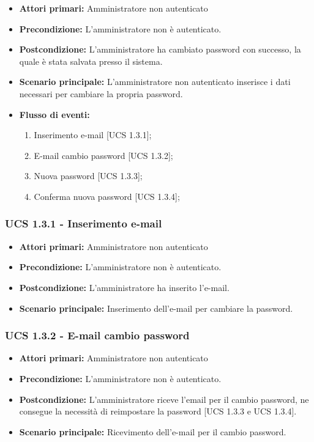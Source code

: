\begin{itemize}
\item \textbf{Attori primari:} Amministratore non autenticato
\item \textbf{Precondizione:}  L'amministratore non è autenticato.
\item \textbf{Postcondizione:} L'amministratore ha cambiato password con successo, la quale è stata salvata presso il sistema.
\item \textbf{Scenario principale:} L'amministratore non autenticato inserisce i dati necessari per cambiare la propria password.
\item \textbf{Flusso di eventi:}
    \begin{enumerate}
        \item Inserimento e-mail [UCS 1.3.1];
        \item E-mail cambio password [UCS 1.3.2];
        \item Nuova password [UCS 1.3.3];
        \item Conferma nuova password [UCS 1.3.4];
    \end{enumerate}
\end{itemize}

\subsubsection{UCS 1.3.1 - Inserimento e-mail}
\begin{itemize}
\item \textbf{Attori primari:} Amministratore non autenticato
\item \textbf{Precondizione:} L'amministratore non è autenticato. %
\item \textbf{Postcondizione:} L'amministratore ha inserito l'e-mail.
\item \textbf{Scenario principale:} Inserimento dell'e-mail per cambiare la password.
\end{itemize}

\subsubsection{UCS 1.3.2 - E-mail cambio password}
\begin{itemize}
\item \textbf{Attori primari:} Amministratore non autenticato
\item \textbf{Precondizione:} L'amministratore non è autenticato.
\item \textbf{Postcondizione:} L'amministratore riceve l'email per il cambio password, ne consegue la necessità di reimpostare la password [UCS 1.3.3 e UCS 1.3.4].
\item \textbf{Scenario principale:} Ricevimento dell'e-mail per il cambio password.
\end{itemize}

